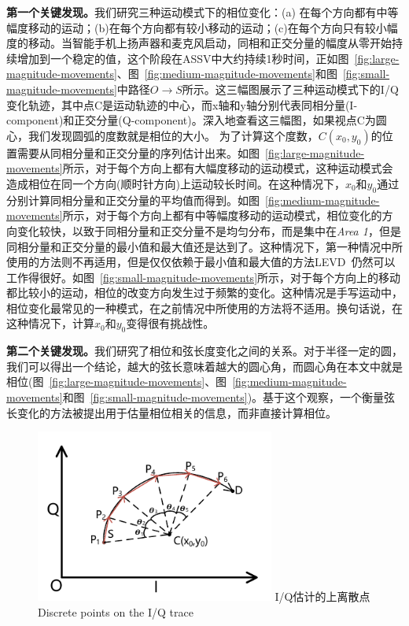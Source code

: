 \textbf{第一个关键发现。}我们研究三种运动模式下的相位变化：(a) 在每个方向都有中等幅度移动的运动；(b)在每个方向都有较小移动的运动；(c)在每个方向只有较小幅度的移动。当智能手机上扬声器和麦克风启动，同相和正交分量的幅度从零开始持续增加到一个稳定的值，这个阶段在ASSV中大约持续1秒时间，正如图~\ref{fig:large-magnitude-movements}、图~\ref{fig:medium-magnitude-movements}和图~\ref{fig:small-magnitude-movements}中路径$O\rightarrow S$所示。这三幅图展示了三种运动模式下的I/Q变化轨迹，其中点C是运动轨迹的中心，而x轴和y轴分别代表同相分量(I-component)和正交分量(Q-component)。深入地查看这三幅图，如果视点C为圆心，我们发现圆弧的度数就是相位的大小。 为了计算这个度数，$C(x_{0},y_{0})$的位置需要从同相分量和正交分量的序列估计出来。如图~\ref{fig:large-magnitude-movements}所示，对于每个方向上都有大幅度移动的运动模式，这种运动模式会造成相位在同一个方向(顺时针方向)上运动较长时间。在这种情况下，$x_0$和$y_0$通过分别计算同相分量和正交分量的平均值而得到。如图~\ref{fig:medium-magnitude-movements}所示，对于每个方向上都有中等幅度移动的运动模式，相位变化的方向变化较快，以致于同相分量和正交分量不是均匀分布，而是集中在\textit{Area 1}，但是同相分量和正交分量的最小值和最大值还是达到了。这种情况下，第一种情况中所使用的方法则不再适用，但是仅仅依赖于最小值和最大值的方法LEVD~\cite{wang2016device}仍然可以工作得很好。如图~\ref{fig:small-magnitude-movements}所示，对于每个方向上的移动都比较小的运动，相位的改变方向发生过于频繁的变化。这种情况是手写运动中，相位变化最常见的一种模式，在之前情况中所使用的方法将不适用。换句话说，在这种情况下，计算$x_{0}$和$y_{0}$变得很有挑战性。

\textbf{第二个关键发现。}我们研究了相位和弦长度变化之间的关系。对于半径一定的圆，我们可以得出一个结论，越大的弦长意味着越大的圆心角，而圆心角在本文中就是相位(图~\ref{fig:large-magnitude-movements}、图~\ref{fig:medium-magnitude-movements}和图~\ref{fig:small-magnitude-movements})。基于这个观察，一个衡量弦长变化的方法被提出用于估量相位相关的信息，而非直接计算相位。

\begin{figure}[!htp]
  \centering
  \includegraphics[width=0.7\textwidth]{figure/estimation-geometry.pdf}
  \bicaption
    {I/Q估计的上离散点}
    {Discrete points on the I/Q trace}
  \label{fig:discrete-point-trace}
\end{figure}

